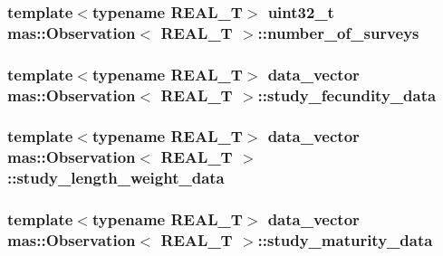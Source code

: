 \subsubsection[{number\+\_\+of\+\_\+surveys}]{\setlength{\rightskip}{0pt plus 5cm}template$<$typename R\+E\+A\+L\+\_\+\+T$>$ uint32\+\_\+t {\bf mas\+::\+Observation}$<$ R\+E\+A\+L\+\_\+\+T $>$\+::number\+\_\+of\+\_\+surveys}\label{classmas_1_1_observation_a6e3ce52d5a415a29b901ba4c8007bbc5}
\hypertarget{classmas_1_1_observation_ae509ef85e4f1fc553388b52784ef712a}{}
\subsubsection[{study\+\_\+fecundity\+\_\+data}]{\setlength{\rightskip}{0pt plus 5cm}template$<$typename R\+E\+A\+L\+\_\+\+T$>$ data\+\_\+vector {\bf mas\+::\+Observation}$<$ R\+E\+A\+L\+\_\+\+T $>$\+::study\+\_\+fecundity\+\_\+data}\label{classmas_1_1_observation_ae509ef85e4f1fc553388b52784ef712a}
\hypertarget{classmas_1_1_observation_a3ab6b2699276ca697d77679a24ae3b79}{}
\subsubsection[{study\+\_\+length\+\_\+weight\+\_\+data}]{\setlength{\rightskip}{0pt plus 5cm}template$<$typename R\+E\+A\+L\+\_\+\+T$>$ data\+\_\+vector {\bf mas\+::\+Observation}$<$ R\+E\+A\+L\+\_\+\+T $>$\+::study\+\_\+length\+\_\+weight\+\_\+data}\label{classmas_1_1_observation_a3ab6b2699276ca697d77679a24ae3b79}
\hypertarget{classmas_1_1_observation_a813400be1f65ae364a6cda022f6dffd7}{}
\subsubsection[{study\+\_\+maturity\+\_\+data}]{\setlength{\rightskip}{0pt plus 5cm}template$<$typename R\+E\+A\+L\+\_\+\+T$>$ data\+\_\+vector {\bf mas\+::\+Observation}$<$ R\+E\+A\+L\+\_\+\+T $>$\+::study\+\_\+maturity\+\_\+data}\label{classmas_1_1_observation_a813400be1f65ae364a6cda022f6dffd7}
\hypertarget{classmas_1_1_observation_a10398b9be5c04879db2bec61fcdd2cee}{}
